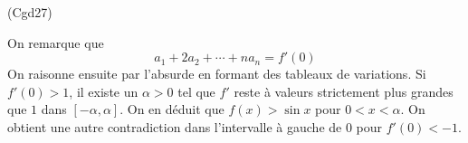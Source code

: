 \begin{tiny}(Cgd27)\end{tiny} On remarque que
\begin{displaymath}
 a_1+2a_2+\cdots+na_n = f'(0)
\end{displaymath}
On raisonne ensuite par l'absurde en formant des tableaux de variations.\newline
Si $f'(0)>1$, il existe un $\alpha >0$ tel que $f'$ reste à valeurs strictement plus grandes que $1$ dans $[-\alpha,\alpha]$. On en déduit que $f(x)>\sin x$ pour $0<x<\alpha$. On obtient une autre contradiction dans l'intervalle à gauche de $0$ pour $f'(0)<-1$.
